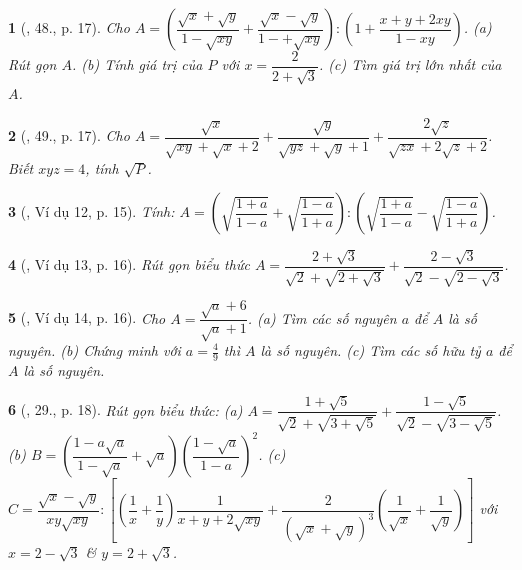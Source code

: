 \documentclass{article}
\newtheorem{baitoan}{}
\begin{document}
\begin{baitoan}[\cite{Tuyen_Toan_9_old}, 48., p. 17]
	Cho $A = \left(\dfrac{\sqrt{x} + \sqrt{y}}{1 - \sqrt{xy}} + \dfrac{\sqrt{x} - \sqrt{y}}{1 -+ \sqrt{xy}}\right):\left(1 + \dfrac{x + y + 2xy}{1 - xy}\right)$. (a) Rút gọn $A$. (b) Tính giá trị của $P$ với $x = \dfrac{2}{2 + \sqrt{3}}$. (c) Tìm giá trị lớn nhất của $A$.
\end{baitoan}

\begin{baitoan}[\cite{Tuyen_Toan_9_old}, 49., p. 17]
	Cho $A = \dfrac{\sqrt{x}}{\sqrt{xy} + \sqrt{x} + 2} + \dfrac{\sqrt{y}}{\sqrt{yz} + \sqrt{y} + 1} + \dfrac{2\sqrt{z}}{\sqrt{zx} + 2\sqrt{z} + 2}$. Biết $xyz = 4$, tính $\sqrt{P}$.
\end{baitoan}

\begin{baitoan}[\cite{Binh_Toan_9_tap_1}, Ví dụ 12, p. 15]
	Tính: $A = \left(\sqrt{\dfrac{1 + a}{1 - a}} + \sqrt{\dfrac{1 - a}{1 + a}}\right):\left(\sqrt{\dfrac{1 + a}{1 - a}} - \sqrt{\dfrac{1 - a}{1 + a}}\right)$.
\end{baitoan}

\begin{baitoan}[\cite{Binh_Toan_9_tap_1}, Ví dụ 13, p. 16]
	Rút gọn biểu thức $A = \dfrac{2 + \sqrt{3}}{\sqrt{2} + \sqrt{2 + \sqrt{3}}} + \dfrac{2 - \sqrt{3}}{\sqrt{2} - \sqrt{2 - \sqrt{3}}}$.
\end{baitoan}

\begin{baitoan}[\cite{Binh_Toan_9_tap_1}, Ví dụ 14, p. 16]
	Cho $A = \dfrac{\sqrt{a} + 6}{\sqrt{a} + 1}$. (a) Tìm các số nguyên $a$ để $A$ là số nguyên. (b) Chứng minh với $a = \frac{4}{9}$ thì $A$ là số nguyên. (c) Tìm các số hữu tỷ $a$ để $A$ là số nguyên.
\end{baitoan}

\begin{baitoan}[\cite{Binh_Toan_9_tap_1}, 29., p. 18]
	Rút gọn biểu thức: (a) $A = \dfrac{1 + \sqrt{5}}{\sqrt{2} + \sqrt{3 + \sqrt{5}}} + \dfrac{1 - \sqrt{5}}{\sqrt{2} - \sqrt{3 - \sqrt{5}}}$.\\(b) $B = \left(\dfrac{1 - a\sqrt{a}}{1 - \sqrt{a}} + \sqrt{a}\right)\left(\dfrac{1 - \sqrt{a}}{1 - a}\right)^2$. (c) $C = \dfrac{\sqrt{x} - \sqrt{y}}{xy\sqrt{xy}}:\left[\left(\dfrac{1}{x} + \dfrac{1}{y}\right)\dfrac{1}{x + y+ 2\sqrt{xy}} + \dfrac{2}{(\sqrt{x} + \sqrt{y})^3}\left(\dfrac{1}{\sqrt{x}} + \dfrac{1}{\sqrt{y}}\right)\right]$ với $x = 2 - \sqrt{3}$ \& $y = 2 + \sqrt{3}$.
\end{baitoan}
\end{document}
